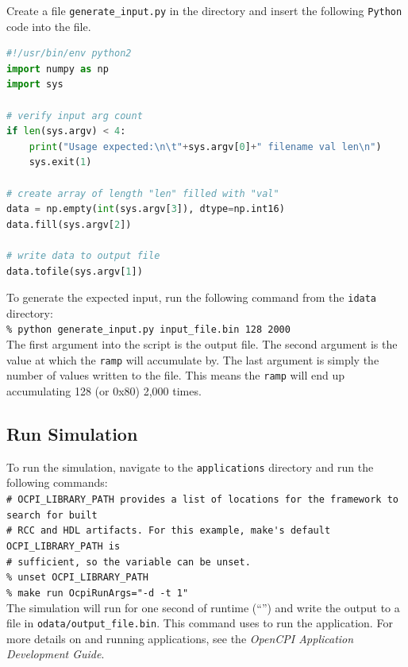 Create a file \verb+generate_input.py+ in the  directory and insert the following \verb+Python+ code into the file.
\begin{lstlisting}[language=python]
#!/usr/bin/env python2
import numpy as np
import sys

# verify input arg count
if len(sys.argv) < 4:
    print("Usage expected:\n\t"+sys.argv[0]+" filename val len\n")
    sys.exit(1)

# create array of length "len" filled with "val"
data = np.empty(int(sys.argv[3]), dtype=np.int16)
data.fill(sys.argv[2])

# write data to output file
data.tofile(sys.argv[1])
\end{lstlisting}

To generate the expected input, run the following command from the \verb+idata+ directory:\\

\forceindent\verb+% python generate_input.py input_file.bin 128 2000+\\

The first argument into the script is the output file. The second argument is the value at which the \verb+ramp+ will accumulate by. The last argument is simply the number of values written to the file. This means the \verb+ramp+ will end up accumulating 128 (or 0x80) 2,000 times.

\subsection{Run Simulation}
\label{example:run}
\bstart
To run the simulation, navigate to the \verb+applications+ directory and run the following commands:\\

\forceindent\verb+# OCPI_LIBRARY_PATH provides a list of locations for the framework to search for built+\\
\forceindent\verb+# RCC and HDL artifacts. For this example, make's default OCPI_LIBRARY_PATH is+\\
\forceindent\verb+# sufficient, so the variable can be unset.+\\
\forceindent\verb+% unset OCPI_LIBRARY_PATH+   \\
\forceindent\verb+% make run OcpiRunArgs="-d -t 1"+\\
\bend
The simulation will run for one second of runtime (``'') and write the output to a file in \verb+odata/output_file.bin+.
This  command uses  to run the application. For more details on  and running applications, see the \textit{OpenCPI Application Development Guide}.

